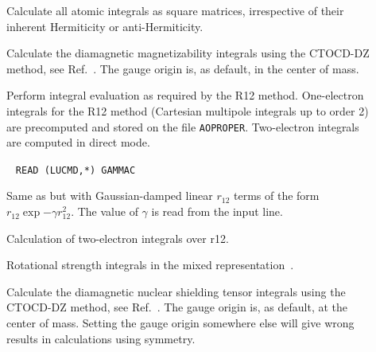 \begin{description}
\item[] Calculate all atomic integrals as square
matrices, irrespective of their inherent Hermiticity or
anti-Hermiticity.

\item[] Calculate the diamagnetic magnetizability integrals using the CTOCD-DZ method,
 see Ref.~\cite{paololazz1,paololazz2}.
The gauge origin is, as default, in the center of mass. 


\item[] Perform integral evaluation as required by the R12 method.
One-electron integrals for the R12 method (Cartesian multipole integrals up to order 2)
are precomputed and stored on the file \texttt{AOPROPER}. Two-electron integrals are
computed in direct mode.

\item[]\verb| |\newline
\verb|READ (LUCMD,*) GAMMAC|

Same as  but with Gaussian-damped linear $r_{12}$ terms of
the form $r_{12}\exp{-\gamma r_{12}^2}$. The value of $\gamma$ is read from the input line.

\item[] Calculation of two-electron integrals over r12.

\item[] Rotational strength integrals in the mixed
representation~\cite{tbphkkrjcp110}.


\item[] Calculate the diamagnetic nuclear shielding tensor 
integrals using the CTOCD-DZ method,
see Ref.~\cite{paololazz1,paololazz2,ctocd}. 
The gauge origin is, as default, at the center of mass. 
Setting the gauge origin somewhere else will give wrong results in calculations using symmetry.


\end{description}
